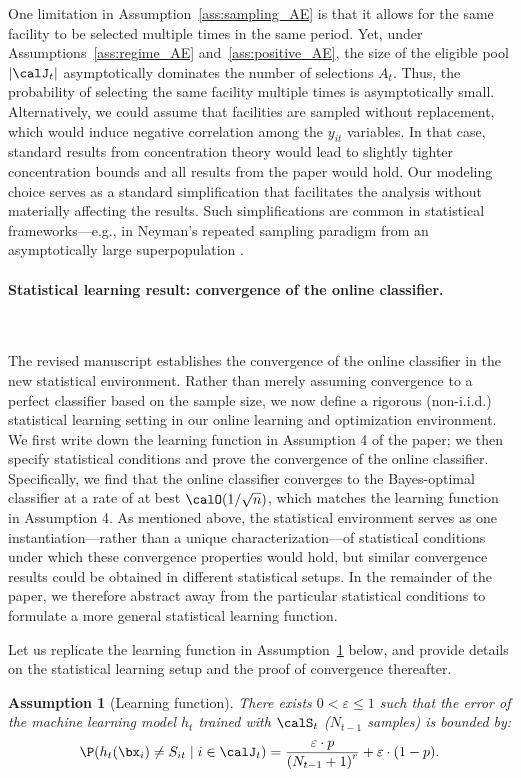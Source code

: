 \documentclass[11pt]{article}
\newtheorem{assumption}{Assumption}[]
\begin{document}
One limitation in Assumption~\ref{ass:sampling_AE} is that it allows for the same facility to be selected multiple times in the same period. Yet, under Assumptions~\ref{ass:regime_AE} and~\ref{ass:positive_AE}, the size of the eligible pool $|\calJ_t|$ asymptotically dominates the number of selections $A_t$. Thus, the probability of selecting the same facility multiple times is asymptotically small. Alternatively, we could assume that facilities are sampled without replacement, which would induce negative correlation among the $y_{it}$ variables. In that case, standard results from concentration theory \citep{serfling1974probability} would lead to slightly tighter concentration bounds and all results from the paper would hold. Our modeling choice serves as a standard simplification that facilitates the analysis without materially affecting the results. Such simplifications are common in statistical frameworks—e.g., in Neyman's repeated sampling paradigm from an asymptotically large superpopulation \citep{Neyman1934,SarndalSwenssonWretman1992}.

\paragraph{Statistical learning result: convergence of the online classifier.}\

The revised manuscript establishes the convergence of the online classifier in the new statistical environment. Rather than merely assuming convergence to a perfect classifier based on the sample size, we now define a rigorous (non-i.i.d.) statistical learning setting in our online learning and optimization environment. We first write down the learning function in Assumption 4 of the paper; we then specify statistical conditions and prove the convergence of the online classifier. Specifically, we find that the online classifier converges to the Bayes-optimal classifier at a rate of at best $\calO(1/\sqrt n)$, which matches the learning function in Assumption 4. As mentioned above, the statistical environment serves as one instantiation—rather than a unique characterization—of statistical conditions under which these convergence properties would hold, but similar convergence results could be obtained in different statistical setups. In the remainder of the paper, we therefore abstract away from the particular statistical conditions to formulate a more general statistical learning function.

Let us replicate the learning function in Assumption~\ref{ass:classification_AE} below, and provide details on the statistical learning setup and the proof of convergence thereafter.
\setcounter{assumption}{3}
\begin{assumption}[Learning function] \label{ass:classification_AE}
    There exists $0<\varepsilon\leq 1$ such that the error of the machine learning model $h_t$ trained with $\calS_t$ ($N_{t-1}$ samples) is bounded by:
    \begin{align*}
        \P(h_t(\bx_{i})\neq S_{it} \mid i \in \calJ_t)=\frac{\varepsilon\cdot p}{\left(N_{t-1} + 1\right)^r}+\varepsilon\cdot(1-p).
    \end{align*}
\end{assumption}
\end{document}

